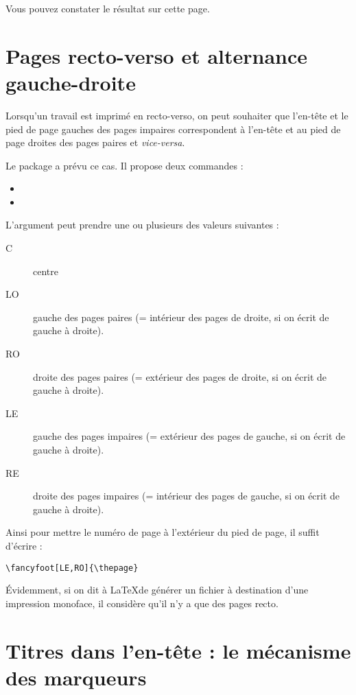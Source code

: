 Vous pouvez constater le résultat sur cette page.\thispagestyle{fancy}\cfoot{{\thepage} / \ref{TotPages}} \renewcommand{\headrulewidth}{0pt}

\section{Pages recto-verso et alternance gauche-droite}

Lorsqu'un travail est imprimé en recto-verso, on peut souhaiter que l'en-tête et le pied de page gauches des pages impaires correspondent à l'en-tête et au pied de page droites des pages paires et \emph{vice-versa}.

Le package  a prévu ce cas. Il propose deux commandes : 
\begin{itemize}
\item {}
\item {}
\end{itemize}

L'argument  peut prendre une ou plusieurs des valeurs suivantes :
\begin{description}
\item[C] centre
\item[LO] gauche des pages paires (= intérieur des pages de droite, si on écrit de gauche à droite).
\item[RO] droite des pages paires (= extérieur des pages de droite, si on écrit de gauche à droite).
\item[LE] gauche des pages impaires (= extérieur des pages  de gauche, si on écrit de gauche à droite).
\item[RE] droite des pages impaires (= intérieur des pages de gauche, si on écrit de gauche à droite).
\end{description}

Ainsi pour mettre le numéro de page à l'extérieur du pied de page, il suffit d'écrire :

\begin{verbatim}
\fancyfoot[LE,RO]{\thepage}
\end{verbatim}

Évidemment, si on dit à \LaTeX de générer un fichier à destination d'une impression monoface, il considère qu'il n'y a que des pages recto.

\section{Titres dans l'en-tête : le mécanisme des marqueurs}

